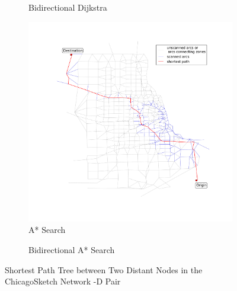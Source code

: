 \begin{figure}
\begin{subfigure}{.5\textwidth}
        \caption{Bidirectional Dijkstra}
        \label{fig:chicago_bidirect}
    \end{subfigure}
    \begin{subfigure}{.5\textwidth}
        \centering
        \includegraphics[width=\textwidth,trim=120px 120px 48px 0px,clip]{img/chicago_astar}
        \caption{A* Search}
        \label{fig:chicago_Astar_bidirect}
    \end{subfigure}%
    \begin{subfigure}{.5\textwidth}
        \centering
        \caption{Bidirectional A* Search}
        \label{fig:chicago_astar_bidirect}
    \end{subfigure}
    \vspace{1em}
    \caption{Shortest Path Tree between Two Distant Nodes in the ChicagoSketch Network -D Pair}
    \label{fig:long_sptree}
\end{figure}


